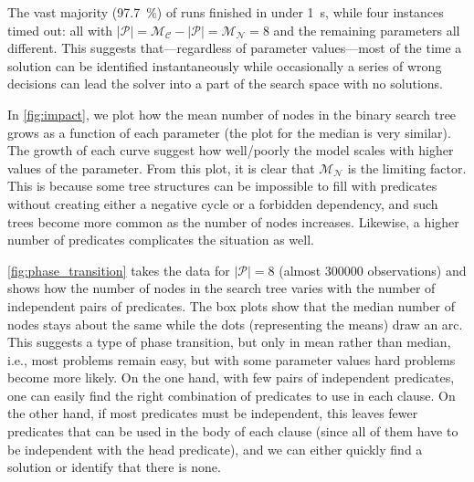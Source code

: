 \documentclass[letterpaper]{article}
\theoremstyle{definition}
\newcommand{\predicates}{\mathcal{P}}
\newcommand{\maxNumNodes}{\mathcal{M}_{\mathcal{N}}}
\newcommand{\maxNumClauses}{\mathcal{M}_{\mathcal{C}}}
\begin{document}
The vast majority (\SI{97.7}{\percent}) of runs finished in under
\SI{1}{\second}, while four instances timed out: all with $|\predicates| =
\maxNumClauses{} - |\predicates{}| = \maxNumNodes{} = 8$ and the remaining
parameters all different. This suggests that---regardless of parameter
values---most of the time a solution can be identified instantaneously while
occasionally a series of wrong decisions can lead the solver into a part of the
search space with no solutions.

In \cref{fig:impact}, we plot how the mean number of nodes in the binary search
tree grows as a function of each parameter (the plot for the median is very
similar). The growth of each curve suggest how well/poorly the model scales with
higher values of the parameter. From this plot, it is clear that
$\maxNumNodes{}$ is the limiting factor. This is because some tree structures
can be impossible to fill with predicates without creating either a negative
cycle or a forbidden dependency, and such trees become more common as the number
of nodes increases. Likewise, a higher number of predicates complicates the
situation as well.

\cref{fig:phase_transition} takes the data for $|\predicates{}| = 8$ (almost
\num{300000} observations) and shows how the number of nodes in the search tree
varies with the number of independent pairs of predicates. The box plots show
that the median number of nodes stays about the same while the dots
(representing the means) draw an arc. This suggests a type of phase transition,
but only in mean rather than median, i.e., most problems remain easy, but with
some parameter values hard problems become more likely. On the one hand, with
few pairs of independent predicates, one can easily find the right combination
of predicates to use in each clause. On the other hand, if most predicates must
be independent, this leaves fewer predicates that can be used in the body of
each clause (since all of them have to be independent with the head predicate),
and we can either quickly find a solution or identify that there is none.

\end{document}
